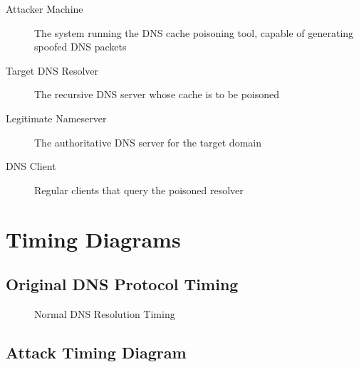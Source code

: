 \documentclass[12pt,a4paper]{article}
\begin{document}
\begin{description}
    \item[Attacker Machine] The system running the DNS cache poisoning tool, capable of generating spoofed DNS packets
    \item[Target DNS Resolver] The recursive DNS server whose cache is to be poisoned
    \item[Legitimate Nameserver] The authoritative DNS server for the target domain
    \item[DNS Client] Regular clients that query the poisoned resolver
\end{description}

\section{Timing Diagrams}

\subsection{Original DNS Protocol Timing}

\begin{figure}[H]
\centering
{}
\caption{Normal DNS Resolution Timing}
\label{fig:normal_timing}
\end{figure}

\subsection{Attack Timing Diagram}
\end{document}
